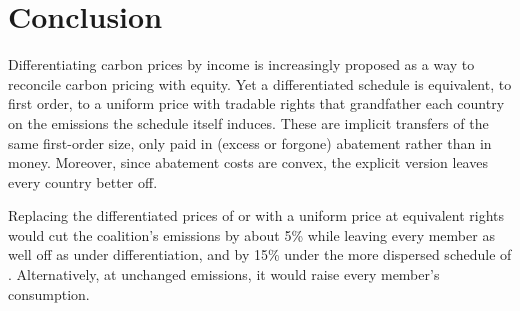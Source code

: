 \documentclass[12pt,english]{article}
\theoremstyle{remark}
\begin{document}

\FloatBarrier

\section{Conclusion}
\label{sec:conclusion}

Differentiating carbon prices by income is increasingly proposed as a way to reconcile carbon pricing with equity. %
Yet a differentiated schedule is equivalent, to first order, to a uniform price with tradable rights that grandfather each country on the emissions the schedule itself induces. These are implicit transfers of the same first-order size, only paid in (excess or forgone) abatement rather than in money. 
Moreover, since abatement costs are convex, the explicit version leaves every country better off.

Replacing the differentiated prices of \citet{wolfram_building_2025} or \citet{banerjee_grand_2025} with a uniform price at equivalent rights would cut the coalition's emissions by about 5\% %
while leaving every member as well off as under differentiation, and by 15\% under the more dispersed schedule of \citet{equal_right_climate_2023}. Alternatively, at unchanged emissions, it would raise every member's consumption. %
\end{document}
